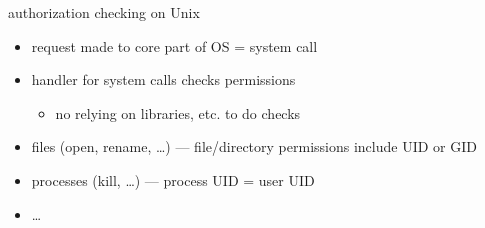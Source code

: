 \begin{frame}{authorization checking on Unix}
    \begin{itemize}
    \item request made to core part of OS = system call
    \item handler for system calls checks permissions
        \begin{itemize}
        \item no relying on libraries, etc. to do checks
        \end{itemize}
    \vspace{.5cm}
    \item files (open, rename, \ldots) --- file/directory permissions include UID or GID
    \item processes (kill, \ldots) --- process UID = user UID
    \item \ldots
    \end{itemize}
\end{frame}
